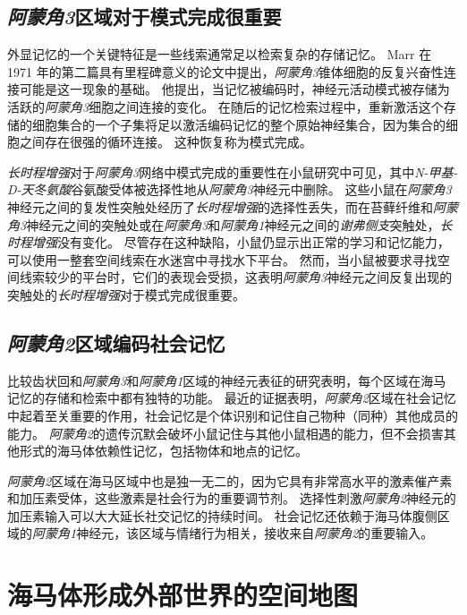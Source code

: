 \subsection{\textit{阿蒙角3}区域对于模式完成很重要}

外显记忆的一个关键特征是一些线索通常足以检索复杂的存储记忆。
Marr 在 1971 年的第二篇具有里程碑意义的论文中提出，\textit{阿蒙角3}锥体细胞的反复兴奋性连接可能是这一现象的基础。
他提出，当记忆被编码时，神经元活动模式被存储为活跃的\textit{阿蒙角3}细胞之间连接的变化。
在随后的记忆检索过程中，重新激活这个存储的细胞集合的一个子集将足以激活编码记忆的整个原始神经集合，因为集合的细胞之间存在很强的循环连接。
这种恢复称为模式完成。


\textit{长时程增强}对于\textit{阿蒙角3}网络中模式完成的重要性在小鼠研究中可见，其中\textit{N-甲基-D-天冬氨酸}谷氨酸受体被选择性地从\textit{阿蒙角3}神经元中删除。
这些小鼠在\textit{阿蒙角3}神经元之间的复发性突触处经历了\textit{长时程增强}的选择性丢失，而在苔藓纤维和\textit{阿蒙角3}神经元之间的突触处或在\textit{阿蒙角3}和\textit{阿蒙角1}神经元之间的\textit{谢弗侧支}突触处，\textit{长时程增强}没有变化。
尽管存在这种缺陷，小鼠仍显示出正常的学习和记忆能力，可以使用一整套空间线索在水迷宫中寻找水下平台。
然而，当小鼠被要求寻找空间线索较少的平台时，它们的表现会受损，这表明\textit{阿蒙角3}神经元之间反复出现的突触处的\textit{长时程增强}对于模式完成很重要。



\subsection{\textit{阿蒙角2}区域编码社会记忆}

比较齿状回和\textit{阿蒙角3}和\textit{阿蒙角1}区域的神经元表征的研究表明，每个区域在海马记忆的存储和检索中都有独特的功能。
最近的证据表明，\textit{阿蒙角2}区域在社会记忆中起着至关重要的作用，社会记忆是个体识别和记住自己物种（同种）其他成员的能力。
\textit{阿蒙角2}的遗传沉默会破坏小鼠记住与其他小鼠相遇的能力，但不会损害其他形式的海马体依赖性记忆，包括物体和地点的记忆。


\textit{阿蒙角2}区域在海马区域中也是独一无二的，因为它具有非常高水平的激素催产素和加压素受体，这些激素是社会行为的重要调节剂。
选择性刺激\textit{阿蒙角2}神经元的加压素输入可以大大延长社交记忆的持续时间。
社会记忆还依赖于海马体腹侧区域的\textit{阿蒙角1}神经元，该区域与情绪行为相关，接收来自\textit{阿蒙角2}的重要输入。



\section{海马体形成外部世界的空间地图}

